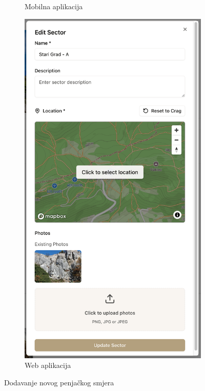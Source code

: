 \begin{figure}[H]
\begin{subfigure}[b]{0.38\textwidth}
        \caption{Mobilna aplikacija}
        \label{fig:dodavanje_smjera_mob}
    \end{subfigure}
    \hfill
    \begin{subfigure}[b]{0.43\textwidth}
        \centering
        \includegraphics[width=\textwidth]{images/implementacija/web/editing-options/edit-sector.png}
        \caption{Web aplikacija}
        \label{fig:dodavanje_smjera_web}
    \end{subfigure}
    \caption{Dodavanje novog penjačkog smjera}
    \label{fig:dodavanje_smjera}
\end{figure}

